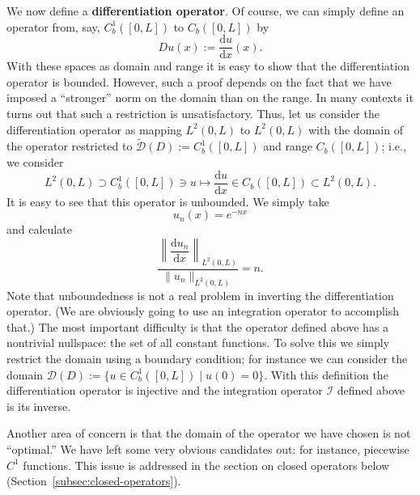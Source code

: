 \begin{Example}
\label{ex:differentiation-operator-domain-and-unboundedness}
We now define a \textbf{differentiation operator}. Of course, we can simply define an operator from, say, $C_b^1([0,L])$ to $C_b([0,L])$ by
\begin{equation}\label{eq:differentiation-operator-pointwise-definition}
Du(x):=\dfrac{\mathrm{d}u}{\mathrm{d}x}(x).
\end{equation}
With these spaces as domain and range it is easy to show that the differentiation operator is bounded. However, such a proof depends on the fact that we have imposed a ``stronger'' norm on the domain than on the range. In many contexts it turns out that such a restriction is unsatisfactory. Thus, let us consider the differentiation operator as mapping $L^2(0,L)$ to $L^2(0,L)$ with the domain of the operator restricted to $\widetilde{\mathcal{D}}(D):=C_b^1([0,L])$ and range $C_b([0,L])$; i.e., we consider\[L^2(0,L)\supset C_b^1([0,L])\ni u\mapsto\dfrac{\mathrm{d}u}{\mathrm{d}x}\in C_b([0,L])\subset L^2(0,L).\]It is easy to see that this operator is unbounded. We simply take
\begin{equation}\label{eq:unbounded-differentiation-exponential-sequence}
u_n(x)=e^{-nx}
\end{equation}
and calculate
\begin{equation}\label{eq:unbounded-differentiation-norm-ratio}
\dfrac{\left\|\dfrac{\mathrm{d}u_n}{\mathrm{d}x}\right\|_{L^2(0,L)}}{\|u_n\|_{L^2(0,L)}}=n.
\end{equation}
Note that unboundedness is not a real problem in inverting the differentiation operator. (We are obviously going to use an integration operator to accomplish that.) The most important difficulty is that the operator defined above has a nontrivial nullspace: the set of all constant functions. To solve this we simply restrict the domain using a boundary condition; for instance we can consider the domain $\mathcal{D}(D):=\{u\in C_b^1([0,L])\mid u(0)=0\}$. With this definition the differentiation operator is injective and the integration operator $\mathcal{I}$ defined above is its inverse.

Another area of concern is that the domain of the operator we have chosen is not ``optimal.'' We have left some very obvious candidates out: for instance, piecewise $C^1$ functions. This issue is addressed in the section on closed operators below (Section~\ref{subsec:closed-operators}).
\end{Example}
